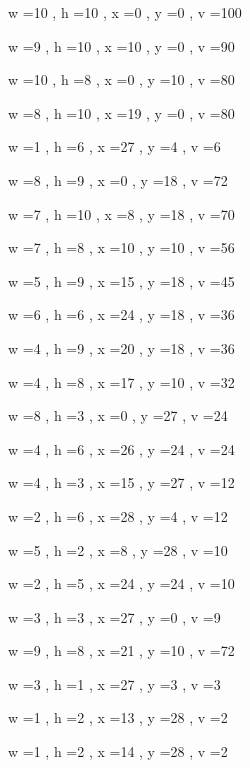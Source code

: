 \documentclass[11pt]{article}
\begin{document}
w =10 , h =10 , x =0 , y =0 , v =100
\par
w =9 , h =10 , x =10 , y =0 , v =90
\par
w =10 , h =8 , x =0 , y =10 , v =80
\par
w =8 , h =10 , x =19 , y =0 , v =80
\par
w =1 , h =6 , x =27 , y =4 , v =6
\par
w =8 , h =9 , x =0 , y =18 , v =72
\par
w =7 , h =10 , x =8 , y =18 , v =70
\par
w =7 , h =8 , x =10 , y =10 , v =56
\par
w =5 , h =9 , x =15 , y =18 , v =45
\par
w =6 , h =6 , x =24 , y =18 , v =36
\par
w =4 , h =9 , x =20 , y =18 , v =36
\par
w =4 , h =8 , x =17 , y =10 , v =32
\par
w =8 , h =3 , x =0 , y =27 , v =24
\par
w =4 , h =6 , x =26 , y =24 , v =24
\par
w =4 , h =3 , x =15 , y =27 , v =12
\par
w =2 , h =6 , x =28 , y =4 , v =12
\par
w =5 , h =2 , x =8 , y =28 , v =10
\par
w =2 , h =5 , x =24 , y =24 , v =10
\par
w =3 , h =3 , x =27 , y =0 , v =9
\par
w =9 , h =8 , x =21 , y =10 , v =72
\par
w =3 , h =1 , x =27 , y =3 , v =3
\par
w =1 , h =2 , x =13 , y =28 , v =2
\par
w =1 , h =2 , x =14 , y =28 , v =2
\par
\newpage


\end{document}
